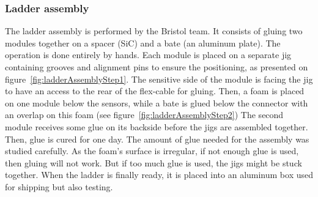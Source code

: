     \subsubsection{Ladder assembly}

    The ladder assembly is performed by the Bristol team.
    It consists of gluing two modules together on a spacer (\gls{SiC}) and a bate (an aluminum plate).
    The operation is done entirely by hands.
    Each module is placed on a separate jig containing grooves and alignment pins to ensure the positioning, as presented on figure~\ref{fig:ladderAssemblyStep1}.
    The sensitive side of the module is facing the jig to have an access to the rear of the flex-cable for gluing.
    Then, a foam is placed on one module below the sensors, while a bate is glued below the connector with an overlap on this foam (see figure~\ref{fig:ladderAssemblyStep2})
    The second module receives some glue on its backside before the jigs are assembled together.
    Then, glue is cured for one day.
    The amount of glue needed for the assembly was studied carefully. 
    As the foam's surface is irregular, if not enough glue is used, then gluing will not work.
    But if too much glue is used, the jigs might be stuck together.
    When the ladder is finally ready, it is placed into an aluminum box used for shipping but also testing.
   
